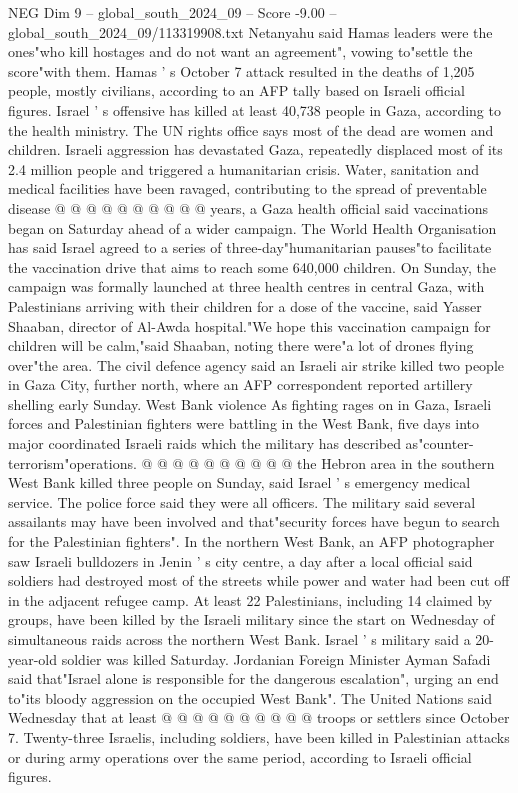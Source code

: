 \begin{textsample}{NEG Dim 9 – global\_south\_2024\_09 – Score -9.00 – global\_south\_2024\_09/113319908.txt}
Netanyahu said Hamas leaders were the ones"who kill hostages and do not want an agreement", vowing to"settle the score"with them.
Hamas ' s October 7 attack resulted in the deaths of 1,205 people, mostly civilians, according to an AFP tally based on Israeli official figures.
Israel ' s offensive has killed at least 40,738 people in Gaza, according to the health ministry.
The UN rights office says most of the dead are women and children.
Israeli aggression has devastated Gaza, repeatedly displaced most of its 2.4 million people and triggered a humanitarian crisis.
Water, sanitation and medical facilities have been ravaged, contributing to the spread of preventable disease @ @ @ @ @ @ @ @ @ @ years, a Gaza health official said vaccinations began on Saturday ahead of a wider campaign.
The World Health Organisation has said Israel agreed to a series of three-day"humanitarian pauses"to facilitate the vaccination drive that aims to reach some 640,000 children.
On Sunday, the campaign was formally launched at three health centres in central Gaza, with Palestinians arriving with their children for a dose of the vaccine, said Yasser Shaaban, director of Al-Awda hospital."We hope this vaccination campaign for children will be calm,"said Shaaban, noting there were"a lot of drones flying over"the area.
The civil defence agency said an Israeli air strike killed two people in Gaza City, further north, where an AFP correspondent reported artillery shelling early Sunday.
West Bank violence As fighting rages on in Gaza, Israeli forces and Palestinian fighters were battling in the West Bank, five days into major coordinated Israeli raids which the military has described as"counter-terrorism"operations. @ @ @ @ @ @ @ @ @ @ the Hebron area in the southern West Bank killed three people on Sunday, said Israel ' s emergency medical service.
The police force said they were all officers.
The military said several assailants may have been involved and that"security forces have begun to search for the Palestinian fighters".
In the northern West Bank, an AFP photographer saw Israeli bulldozers in Jenin ' s city centre, a day after a local official said soldiers had destroyed most of the streets while power and water had been cut off in the adjacent refugee camp.
At least 22 Palestinians, including 14 claimed by groups, have been killed by the Israeli military since the start on Wednesday of simultaneous raids across the northern West Bank.
Israel ' s military said a 20-year-old soldier was killed Saturday.
Jordanian Foreign Minister Ayman Safadi said that"Israel alone is responsible for the dangerous escalation", urging an end to"its bloody aggression on the occupied West Bank".
The United Nations said Wednesday that at least @ @ @ @ @ @ @ @ @ @ troops or settlers since October 7.
Twenty-three Israelis, including soldiers, have been killed in Palestinian attacks or during army operations over the same period, according to Israeli official figures.

\end{textsample}
